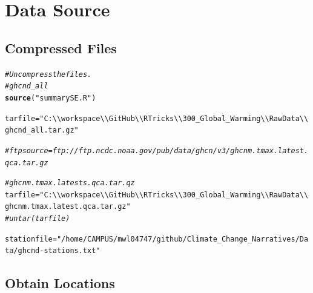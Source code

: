 \documentclass{article}\usepackage[]{graphicx}\usepackage[]{color}
\makeatletter
\newcommand{\hlstr}[1]{\textcolor[rgb]{0.192,0.494,0.8}{#1}}%
\newcommand{\hlcom}[1]{\textcolor[rgb]{0.678,0.584,0.686}{\textit{#1}}}%
\newcommand{\hlstd}[1]{\textcolor[rgb]{0.345,0.345,0.345}{#1}}%
\newcommand{\hlkwb}[1]{\textcolor[rgb]{0.69,0.353,0.396}{#1}}%
\newcommand{\hlkwd}[1]{\textcolor[rgb]{0.737,0.353,0.396}{\textbf{#1}}}%
\newenvironment{kframe}{%
 \def\at@end@of@kframe{}%
 \ifinner\ifhmode%
  \def\at@end@of@kframe{\end{minipage}}%
  \begin{minipage}{\columnwidth}%
 \fi\fi%
 \def\FrameCommand##1{\hskip\@totalleftmargin \hskip-\fboxsep
 \colorbox{shadecolor}{##1}\hskip-\fboxsep
     \hskip-\linewidth \hskip-\@totalleftmargin \hskip\columnwidth}%
 \MakeFramed {\advance\hsize-\width
   \@totalleftmargin\z@ \linewidth\hsize
   \@setminipage}}%
 {\par\unskip\endMakeFramed%
 \at@end@of@kframe}
\newenvironment{knitrout}{}{} %
\makeatother
\begin{document}
\section{Data Source}


\subsection{Compressed Files}

\begin{knitrout}
\color{fgcolor}\begin{kframe}
\begin{alltt}
\hlcom{# Uncompress the files.}
\hlcom{# ghcnd_all}
\hlkwd{source}\hlstd{(}\hlstr{"summarySE.R"}\hlstd{)}

\hlstd{tarfile} \hlkwb{=} \hlstr{"C:\textbackslash{}\textbackslash{}workspace\textbackslash{}\textbackslash{}GitHub\textbackslash{}\textbackslash{}RTricks\textbackslash{}\textbackslash{}300_Global_Warming\textbackslash{}\textbackslash{}Raw Data\textbackslash{}\textbackslash{}ghcnd_all.tar.gz"}

\hlcom{#ftpsource = ftp://ftp.ncdc.noaa.gov/pub/data/ghcn/v3/ghcnm.tmax.latest.qca.tar.gz}


\hlcom{#ghcnm.tmax.latests.qca.tar.qz}
\hlstd{tarfile} \hlkwb{=} \hlstr{"C:\textbackslash{}\textbackslash{}workspace\textbackslash{}\textbackslash{}GitHub\textbackslash{}\textbackslash{}RTricks\textbackslash{}\textbackslash{}300_Global_Warming\textbackslash{}\textbackslash{}Raw Data\textbackslash{}\textbackslash{}ghcnm.tmax.latest.qca.tar.gz"}
\hlcom{# untar(tarfile)}
\end{alltt}
\end{kframe}
\end{knitrout}


\begin{knitrout}
\color{fgcolor}\begin{kframe}
\begin{alltt}
\hlstd{stationfile} \hlkwb{=} \hlstr{"/home/CAMPUS/mwl04747/github/Climate_Change_Narratives/Data/ghcnd-stations.txt"}
\end{alltt}
\end{kframe}
\end{knitrout}

\subsection{Obtain Locations}
\end{document}
